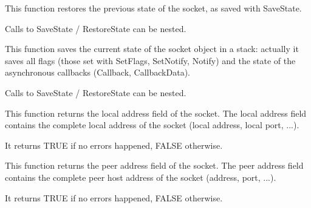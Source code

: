 
%
%
\label{wxsocketbaserestorestate}


This function restores the previous state of the socket, as saved
with SaveState.

Calls to SaveState / RestoreState can be nested.



%
%
\label{wxsocketbasesavestate}


This function saves the current state of the socket object in a stack:
actually it saves all flags (those set with SetFlags, SetNotify, Notify)
and the state of the asynchronous callbacks (Callback, CallbackData).

Calls to SaveState / RestoreState can be nested.



%
%


This function returns the local address field of the socket. The local
address field contains the complete local address of the socket (local
address, local port, ...).


It returns TRUE if no errors happened, FALSE otherwise.

%
%


This function returns the peer address field of the socket. The peer 
address field contains the complete peer host address of the socket
(address, port, ...).


It returns TRUE if no errors happened, FALSE otherwise.

